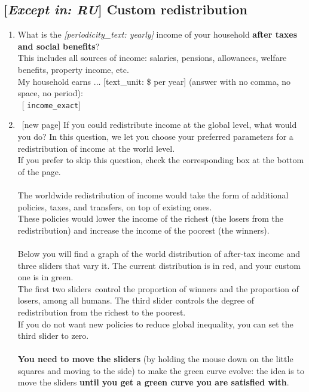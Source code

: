  \subsection*{[\textit{Except in: RU}] Custom redistribution} 
 \begin{enumerate}[resume] 
\item \label{q:income_exact} What is the \textit{[periodicity\_text: yearly]} income of your household \textbf{after taxes and social benefits}?\\This includes all sources of income: salaries, pensions, allowances, welfare benefits, property income, etc.\\My household earns ... [text\_unit: \$ per year] (answer with no comma, no space, no period):\\ 
~[%
\verb|income_exact|]

\item ~[new page] \label{q:custom_redistr} If you could redistribute income at the global level, what would you do? In this question, we let you choose your preferred parameters for a redistribution of income at the world level.~\\If you prefer to skip this question, check the corresponding box at the bottom of the page.\\\\The worldwide redistribution of income would take the form of additional policies, taxes, and transfers, on top of existing ones.\\These policies would lower the income of the richest (the losers from the redistribution) and increase the income of the poorest (the winners).~\\\\Below you will find a graph of the world distribution of after-tax income and three sliders that vary it. The current distribution is in red, and your custom one is in green.~\\The first two sliders~control the proportion of winners and the proportion of losers, among all humans. The third slider controls the degree of redistribution from the richest to the poorest.~\\If you do not want new policies to reduce global inequality, you can set the third slider to zero.~\\\\\textbf{You need to move the sliders} (by holding the mouse down on the little squares and moving to the side) to make the green curve evolve: the idea is to move the sliders \textbf{until you get a green curve you are satisfied with}. \\\\


\end{enumerate}
